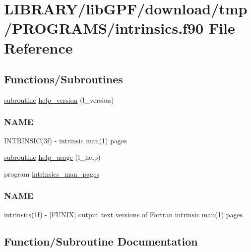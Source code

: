 \hypertarget{intrinsics_8f90}{}\section{L\+I\+B\+R\+A\+R\+Y/lib\+G\+P\+F/download/tmp/\+P\+R\+O\+G\+R\+A\+M\+S/intrinsics.f90 File Reference}
\label{intrinsics_8f90}
\subsection*{Functions/\+Subroutines}
\begin{DoxyCompactItemize}
\item 
\hyperlink{M__stopwatch_83_8txt_acfbcff50169d691ff02d4a123ed70482}{subroutine} \hyperlink{intrinsics_8f90_a39c21619b08a3c22f19e2306efd7f766}{help\+\_\+version} (l\+\_\+version)
\begin{DoxyCompactList}\small\item\em \subsubsection*{N\+A\+ME}

I\+N\+T\+R\+I\+N\+S\+I\+C(3f) -\/ intrinsic man(1) pages \end{DoxyCompactList}\item 
\hyperlink{M__stopwatch_83_8txt_acfbcff50169d691ff02d4a123ed70482}{subroutine} \hyperlink{intrinsics_8f90_a3e09a3b52ee8fb04eeb93fe5761626a8}{help\+\_\+usage} (l\+\_\+help)
\item 
program \hyperlink{intrinsics_8f90_a47ddb3e494b21f6cf5e2853dc6d266b0}{intrinsics\+\_\+man\+\_\+pages}
\begin{DoxyCompactList}\small\item\em \subsubsection*{N\+A\+ME}

intrinsics(1f) -\/ \mbox{[}F\+U\+N\+IX\mbox{]} output text versions of Fortran intrinsic man(1) pages \end{DoxyCompactList}\end{DoxyCompactItemize}


\subsection{Function/\+Subroutine Documentation}
\mbox{\label{intrinsics_8f90_a3e09a3b52ee8fb04eeb93fe5761626a8}} 
